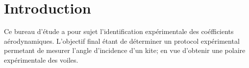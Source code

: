 \chapter{Introduction}
\label{ch:Ch0}

Ce bureau d'étude a pour sujet l'identification expérimentale des coéfficients aérodynamiques. L'objectif final étant de déterminer un protocol expérimental permetant de mesurer l'angle d'incidence d'un kite; en vue d'obtenir une polaire expérimentale des voiles. 